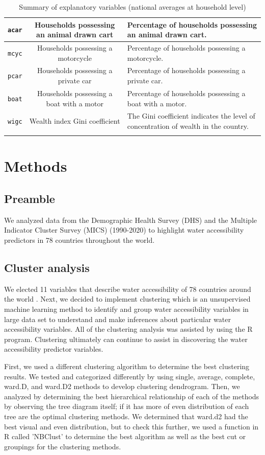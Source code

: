 \documentclass[10pt,twoside]{article}
\numberwithin{equation}{section}
\newcommand{\?}{\stackrel{?}{=}}
\begin{document}
\begin{table}[h!]
\begin{tabular}{c c m{7cm}}
 \texttt{acar} & Households possessing an animal drawn cart
 & Percentage of households possessing an animal drawn cart.
\\\hline
 \texttt{mcyc} & Households possessing a motorcycle
 & Percentage of households possessing a motorcycle.
\\\hline
 \texttt{pcar} & Households possessing a private car
 & Percentage of households possessing a private car.
\\\hline
 \texttt{boat} & Households possessing a boat with a motor
 & Percentage of households possessing a boat with a motor.
\\\hline
 \texttt{wigc} & Wealth index Gini coefficient
 & The Gini coefficient indicates the level of concentration of wealth in the country.
\\\hline
 & \\\bottomrule
  \end{tabular}
  \caption{Summary of explanatory variables (national averages at household level)}
  \label{tab:summary}
\end{table}
 

\section*{Methods}

\subsection*{Preamble}
We analyzed data from the Demographic Health Survey (DHS) and the Multiple Indicator Cluster Survey (MICS) (1990-2020) to highlight water accessibility predictors in 78 countries throughout the world.

\subsection*{Cluster analysis}
We elected 11 variables that describe water accessibility of 78 countries around the world \citep{price2019difference}. Next, we decided to implement clustering which is an unsupervised machine learning method to identify and group water accessibility variables in large data set to understand and make inferences about particular water accessibility variables. All of the clustering analysis was assisted by using the R program. Clustering ultimately can continue to assist in discovering the water accessibility predictor variables. 

First, we used a different clustering algorithm to determine the best clustering results. We tested and categorized differently by using single, average, complete, ward.D, and ward.D2 methods to develop clustering dendrogram. Then, we analyzed by determining the best hierarchical relationship of each of the methods by observing the tree diagram itself; if it has more of even distribution of each tree are the optimal clustering methods. We determined that ward.d2 had the best visual and even distribution, but to check this further, we used a function in R called 'NBClust' to determine the best algorithm as well as the best cut or groupings for the clustering methods. 
\end{document}
